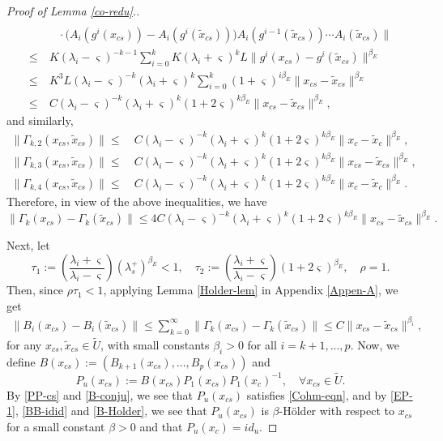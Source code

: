 \documentclass[reqno]{amsart}
\numberwithin{equation}{section}
\begin{document}
\begin{proof}[Proof of Lemma {\rm \ref{co-redu}}.]
\begin{align*}
\\
&\quad  \cdot\big(A_i(g^i(x_{cs}))-A_i(g^i(\tilde{x}_{cs})) \big)
   A_i(g^{i-1}(\tilde{x}_{cs})) \cdots A_i(\tilde{x}_{cs}) \|
\\
\le&~ K (\lambda_i-\varsigma)^{-k-1} \sum_{i=0}^k K (\lambda_i+\varsigma)^k L\|g^i(x_{cs})-g^i(\tilde{x}_{cs})\|^{\beta_E}
\\
\le&~ K^3L (\lambda_i-\varsigma)^{-k}(\lambda_i+\varsigma)^{k}
\sum_{i=0}^k (1+\varsigma)^{i \beta_E}
\|x_{cs}-\tilde{x}_{cs}\|^{\beta_E}
\\
\le &~ C (\lambda_i-\varsigma)^{-k}(\lambda_i+\varsigma)^{k} (1+2\varsigma)^{k \beta_E}\|x_{cs}-\tilde{x}_{cs}\|^{\beta_E},
\end{align*}
and similarly,
\begin{align*}
\|\Gamma_{k,2}(x_{cs},\tilde{x}_{cs})\| \le &~
C (\lambda_i-\varsigma)^{-k}(\lambda_i+\varsigma)^{k} (1+2\varsigma)^{k \beta_E }\|x_{c}-\tilde{x}_{c}\|^{\beta_E},
\\
\|\Gamma_{k,3}(x_{cs},\tilde{x}_{cs})\| \le &~ C (\lambda_i-\varsigma)^{-k}(\lambda_i+\varsigma)^{k} (1+2\varsigma)^{k \beta_E}\|x_{cs}-\tilde{x}_{cs}\|^{\beta_E},
\\
\|\Gamma_{k,4}(x_{cs},\tilde{x}_{cs})\| \le &~
C (\lambda_i-\varsigma)^{-k}(\lambda_i+\varsigma)^{k} (1+2\varsigma)^{k \beta_E}\|x_{c}-\tilde{x}_{c}\|^{\beta_E}.
\end{align*}
Therefore, in view of the above inequalities, we have
$$
\| \Gamma_k(x_{cs})-\Gamma_k(\tilde{x}_{cs}) \| \le 4C (\lambda_i-\varsigma)^{-k}(\lambda_i+\varsigma)^{k} (1+2\varsigma)^{k \beta_E}\|x_{cs}-\tilde{x}_{cs}\|^{\beta_E}.
$$

Next, let
$$
\tau_1 := \left(\frac{\lambda_i + \varsigma}{\lambda_i - \varsigma}\right) (\lambda_s^ +)^{\beta_E}<1, \quad
\tau_2 := \left(\frac{\lambda_i + \varsigma}{\lambda_i - \varsigma}\right) (1+2\varsigma)^{\beta_E}, \quad \rho=1.
$$
Then, since $\rho\tau_1<1$,  applying  Lemma \ref{Holder-lem} in Appendix \ref{Appen-A}, we get
\begin{align}\label{B-Holder}
\|B_{i}(x_{cs})-B_{i}(\tilde{x}_{cs})\|\le \sum_{k=0}^\infty \|\Gamma_k(x_{cs})-\Gamma_k(\tilde{x}_{cs})\| \le C \|x_{cs}-\tilde{x}_{cs}\|^{\beta_i},
\end{align}
for any $x_{cs},\tilde{x}_{cs}\in \tilde{U}$,
with small constants $\beta_i>0$ for all $i=k+1,...,p$.
Now, we define
$
B(x_{cs}):=(B_{k+1}(x_{cs}),...,B_p(x_{cs}))
$
and
$$
P_u(x_{cs}):=B(x_{cs})P_1(x_{cs})P_1(x_c)^{-1}, \quad \forall x_{cs}\in \tilde{U}.
$$
By \eqref{PP-cs} and \eqref{B-conju}, we see that $P_u(x_{cs})$ satisfies \eqref{Cohm-eqn}, and
by \eqref{EP-1}, \eqref{BB-idid} and \eqref{B-Holder}, we see that $P_u(x_{cs})$ is $\beta$-H\"older with respect to $x_{cs}$ for a small constant $\beta>0$ and that $P_u(x_{c})=id_u$.



\end{proof}
\end{document}
